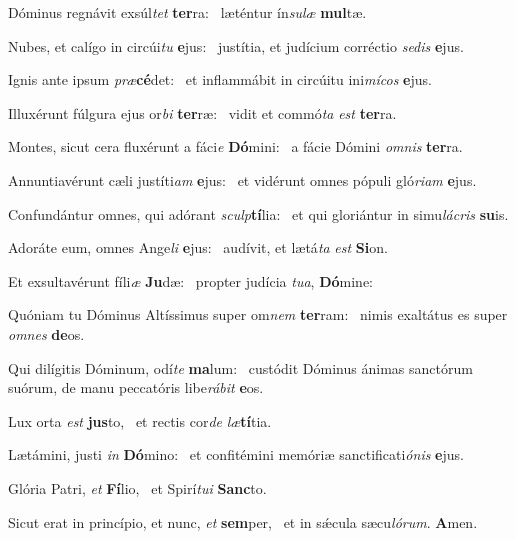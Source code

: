 \item Dóminus regnávit exsúl\textit{tet} \textbf{ter}ra:~\psstar{} læténtur ín\textit{sulæ} \textbf{mul}tæ.
\item Nubes, et calígo in circúi\textit{tu} \textbf{e}jus:~\psstar{} justítia, et judícium corréctio \textit{sedis} \textbf{e}jus.
\item Ignis ante ipsum \textit{præ}\textbf{cé}det:~\psstar{} et inflammábit in circúitu ini\textit{mícos} \textbf{e}jus.
\item Illuxérunt fúlgura ejus or\textit{bi} \textbf{ter}ræ:~\psstar{} vidit et commó\textit{ta} \textit{est} \textbf{ter}ra.
\item Montes, sicut cera fluxérunt a fáci\textit{e} \textbf{Dó}mini:~\psstar{} a fácie Dómini \textit{omnis} \textbf{ter}ra.
\item Annuntiavérunt cæli justíti\textit{am} \textbf{e}jus:~\psstar{} et vidérunt omnes pópuli gló\textit{riam} \textbf{e}jus.
\item Confundántur omnes, qui adórant \textit{sculp}\textbf{tí}lia:~\psstar{} et qui gloriántur in simu\textit{lácris} \textbf{su}is.
\item Adoráte eum, omnes Ange\textit{li} \textbf{e}jus:~\psstar{} audívit, et lætá\textit{ta} \textit{est} \textbf{Si}on.
\item Et exsultavérunt fíli\textit{æ} \textbf{Ju}dæ:~\psstar{} propter judícia \textit{tua}, \textbf{Dó}mine:
\item Quóniam tu Dóminus Altíssimus super om\textit{nem} \textbf{ter}ram:~\psstar{} nimis exaltátus es super \textit{omnes} \textbf{de}os.
\item Qui dilígitis Dóminum, odí\textit{te} \textbf{ma}lum:~\psstar{} custódit Dóminus ánimas sanctórum suórum, de manu peccatóris libe\textit{rábit} \textbf{e}os.
\item Lux orta \textit{est} \textbf{jus}to,~\psstar{} et rectis cor\textit{de} \textit{læ}\textbf{tí}tia.
\item Lætámini, justi \textit{in} \textbf{Dó}mino:~\psstar{} et confitémini memóriæ sanctificati\textit{ónis} \textbf{e}jus.
\item Glória Patri, \textit{et} \textbf{Fí}lio,~\psstar{} et Spirí\textit{tui} \textbf{Sanc}to.
\item Sicut erat in princípio, et nunc, \textit{et} \textbf{sem}per,~\psstar{} et in sǽcula sæcu\textit{lórum}. \textbf{A}men.